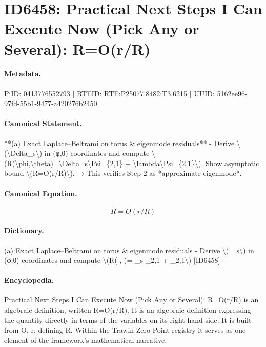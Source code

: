 \section*{ID6458: Practical Next Steps I Can Execute Now (Pick Any or Several): R=O(r/R)}
\paragraph{Metadata.}
PiID: 0413776552793 | RTEID: RTE:P25077.8482:T3.6215 | UUID: 5162ee96-97fd-55b1-9477-a420276b2450

\paragraph{Canonical Statement.}
**(a) Exact Laplace–Beltrami on torus \& eigenmode residuals** - Derive \textbackslash{}(\textbackslash{}Delta\_s\textbackslash{}) in (φ,θ) coordinates and compute \textbackslash{}(R(\textbackslash{}phi,\textbackslash{}theta)=\textbackslash{}Delta\_s\textbackslash{}Psi\_\{2,1\} + \textbackslash{}lambda\textbackslash{}Psi\_\{2,1\}\textbackslash{}). Show asymptotic bound \textbackslash{}(R=O(r/R)\textbackslash{}). → This verifies Step 2 as *approximate eigenmode*.

\paragraph{Canonical Equation.}
\[
R=O(r/R)
\]

\paragraph{Dictionary.}
(a) Exact Laplace–Beltrami on torus \& eigenmode residuals - Derive \textbackslash{}( \_s\textbackslash{}) in (φ,θ) coordinates and compute \textbackslash{}(R( , )= \_s \_2,1 + \_2,1\textbackslash{}) [ID6458]

\paragraph{Encyclopedia.}
Practical Next Steps I Can Execute Now (Pick Any or Several): R=O(r/R) is an algebraic definition, written R=O(r/R). It is an algebraic definition expressing the quantity directly in terms of the variables on its right-hand side. It is built from O, r, defining R. Within the Trawin Zero Point registry it serves as one element of the framework's mathematical narrative.
